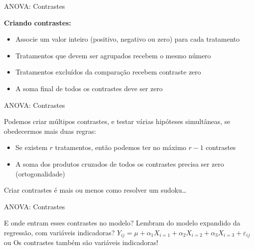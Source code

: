 \documentclass{beamer}\usepackage[]{graphicx}\usepackage[]{color}
\begin{document}
\begin{frame}{ANOVA: Contrastes}

\textbf{Criando contrastes:}
\vfill
\begin{itemize}
  \item Associe um valor inteiro (positivo, negativo ou zero) para cada tratamento \pause
  \vfill
  \item Tratamentos que devem ser agrupados recebem o mesmo número \pause
  \vfill
  \item Tratamentos excluídos da comparação recebem contraste zero \pause
  \vfill
  \item A soma final de todos os contrastes deve ser zero
\end{itemize}

\end{frame}

\begin{frame}{ANOVA: Contrastes}

Podemos criar múltipos contrastes, e testar várias hipóteses simultâneas, se obedecermos mais duas regras:
\vfill
\begin{itemize}
  \item Se existem $r$ tratamentos, então podemos ter no máximo $r-1$ contrastes \pause
  \vfill
  \item A soma dos produtos cruzados de todos os contrastes precisa ser zero (ortogonalidade) \pause
  \vfill
\end{itemize}

Criar contrastes é mais ou menos como resolver um sudoku\ldots

\end{frame}


\begin{frame}{ANOVA: Contrastes}

E onde entram esses contrastes no modelo?
\vfill
Lembram do modelo expandido da regressão, com variáveis indicadoras?
\vfill
$Y_{ij} = \mu + \alpha _1 X_{i=1} + \alpha _2 X_{i=2} + \alpha _3 X_{i=3} + \varepsilon _{ij}$  ou \pause
\vfill
Os contrastes também são variáveis indicadoras! \pause
\vfill

\end{frame}
\end{document}
